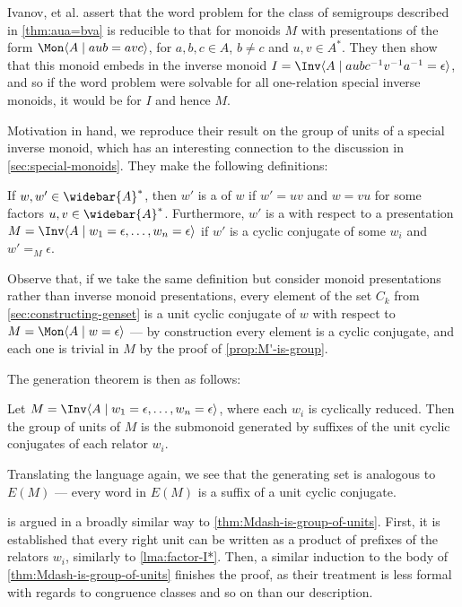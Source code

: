 \documentclass[noindex,noinsetproof,emphthm,12pt]{lmaths}
\newcommand{\Abar}{\widebar{A}}
\begin{document}
Ivanov, et al. assert that the word problem for the class of semigroups described in \cref{thm:aua=bva} is reducible to that for monoids $M$ with presentations of the form $\Mon \langle A \mid aub = avc \rangle$, for $a, b, c \in A$, $b \ne c$ and $u, v \in A^*$. They then show that this monoid embeds in the inverse monoid $I = \Inv \langle A \mid aubc^{-1}v^{-1}a^{-1} = \epsilon\rangle$, and so if the word problem were solvable for all one-relation special inverse monoids, it would be for $I$ and hence $M$.


Motivation in hand, we reproduce their result on the group of units of a special inverse monoid, which has an interesting connection to the discussion in \cref{sec:special-monoids}. They make the following definitions:

\begin{defn}
	If $w, w' \in \Abar^*$, then $w'$ is a  of $w$ if $w' = uv$ and $w = vu$ for some factors $u, v \in \Abar^*$. Furthermore, $w'$ is a  with respect to a presentation $M = \Inv \langle A \mid w_1 = \epsilon, \ldots, w_n = \epsilon \rangle$ if $w'$ is a cyclic conjugate of some $w_i$ and $w' =_M \epsilon$.
\end{defn}

Observe that, if we take the same definition but consider monoid presentations rather than inverse monoid presentations, every element of the set $C_k$ from \cref{sec:constructing-genset} is a unit cyclic conjugate of $w$ with respect to $M = \Mon \langle A \mid w = \epsilon \rangle$ --- by construction every element is a cyclic conjugate, and each one is trivial in $M$ by the proof of \cref{prop:M'-is-group}.

The generation theorem is then as follows:

\begin{theorem} \label{thm:inv-monoid-units-unit-conjugates}
	Let $M = \Inv \langle A \mid w_1 = \epsilon, \ldots, w_n = \epsilon\rangle$, where each $w_i$ is cyclically reduced. Then the group of units of $M$ is the submonoid generated by suffixes of the unit cyclic conjugates of each relator $w_i$.
\end{theorem}

Translating the language again, we see that the generating set is analogous to $E(M)$ --- every word in $E(M)$ is a suffix of a unit cyclic conjugate.

 is argued in a broadly similar way to \cref{thm:Mdash-is-group-of-units}. First, it is established that every right unit can be written as a product of prefixes of the relators $w_i$, similarly to \cref{lma:factor-I*}. Then, a similar induction to the body of \cref{thm:Mdash-is-group-of-units} finishes the proof, as their treatment is less formal with regards to congruence classes and so on than our description.
\end{document}
